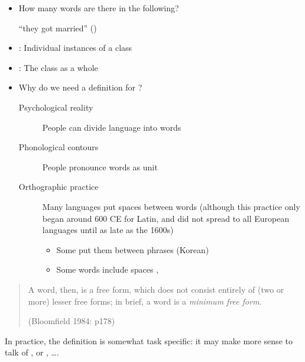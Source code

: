 \documentclass[headrule,footrule]{foils}
\begin{document}

\begin{itemize}
\item How many words are there in the following?
  \begin{exe}
  \ex {}
  \ex {}
  \ex {}
  \ex {} ``they got married'' ()
\end{exe}  

\item {}: Individual instances of a class
\item {}: The class as a whole
\end{itemize}
\newpage
\begin{itemize}
\item  Why do we need a definition for ?
  \begin{description}
  \item [Psychological reality]  People can divide language into words
  \item [Phonological contours]  People pronounce words as unit
  \item [Orthographic practice] Many languages put spaces between words
(although this practice only began around 600 CE for Latin, and did
not spread to all European languages until as late as the 1600s)
 \begin{itemize}
 \item Some put them between phrases (Korean)
 \item Some words include spaces , 
  \end{itemize}
\end{description}
\end{itemize}


\begin{quote}
A word, then, is a free form, which does not consist
entirely of (two or more) lesser free forms; in brief, a
word is a \textit{minimum free form}.
\begin{flushright}
  (Bloomfield 1984: p178) 
\end{flushright}
 \end{quote}

In practice, the definition is somewhat task specific: it may make more sense to talk of ,  or , \ldots .
\end{document}
